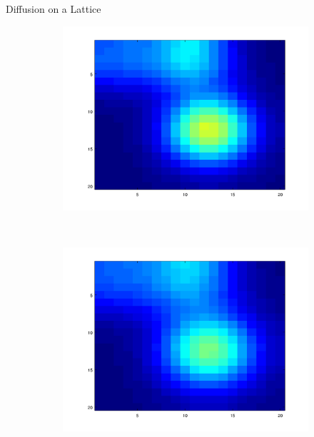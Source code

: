 \documentclass[10pt]{beamer}
\begin{document}
\begin{frame}{Diffusion on a Lattice}
\begin{figure}[!h]
\begin{subfigure}[b]{0.25\textwidth}
			\includegraphics[width= \textwidth]{images/anim_110.png}
		\end{subfigure}~
		\begin{subfigure}[b]{0.25\textwidth}
			\includegraphics[width= \textwidth]{images/anim_145.png}
		\end{subfigure}\\
		\begin{subfigure}[b]{0.25\textwidth}

\end{subfigure}
\end{figure}
\end{frame}
\end{document}

